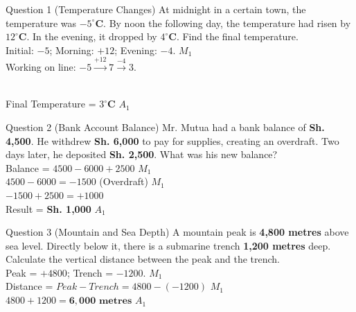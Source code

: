 \documentclass[12pt, a4paper, oneside]{article}
\begin{document}
\begin{solvingbox}{Question 1 (Temperature Changes)}
At midnight in a certain town, the temperature was \textbf{$-5^\circ$C}. By noon the following day, the temperature had risen by \textbf{$12^\circ$C}. In the evening, it dropped by \textbf{$4^\circ$C}. Find the final temperature. \\
Initial: $-5$; Morning: $+12$; Evening: $-4$. \hfill $M_1$ \\
Working on line: $-5 \xrightarrow{+12} 7 \xrightarrow{-4} 3$. \\
 \\
Final Temperature = \textbf{$3^\circ$C} \hfill $A_1$
\end{solvingbox}

\begin{solvingbox}{Question 2 (Bank Account Balance)}
Mr. Mutua had a bank balance of \textbf{Sh. 4,500}. He withdrew \textbf{Sh. 6,000} to pay for supplies, creating an overdraft. Two days later, he deposited \textbf{Sh. 2,500}. What was his new balance? \\
Balance = $4500 - 6000 + 2500$ \hfill $M_1$ \\
$4500 - 6000 = -1500$ (Overdraft) \hfill $M_1$ \\
$-1500 + 2500 = +1000$ \\
Result = \textbf{Sh. 1,000} \hfill $A_1$
\end{solvingbox}

\begin{solvingbox}{Question 3 (Mountain and Sea Depth)}
A mountain peak is \textbf{4,800 metres} above sea level. Directly below it, there is a submarine trench \textbf{1,200 metres} deep. Calculate the vertical distance between the peak and the trench. \\
Peak = $+4800$; Trench = $-1200$. \hfill $M_1$ \\
Distance = $Peak - Trench = 4800 - (-1200)$ \hfill $M_1$ \\
$4800 + 1200 = \mathbf{6,000\text{ metres}}$ \hfill $A_1$
\end{solvingbox}
\end{document}
